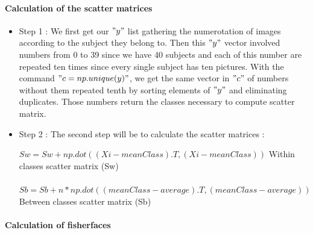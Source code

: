 \paragraph{Calculation of the scatter matrices }
\begin{itemize}
\item Step 1 : We first get our $"y"$ list  gathering the numerotation of images according to the subject they belong to. Then this $"y"$ vector involved numbers from 0 to 39 since we have 40 subjects and each of this number are repeated ten times since every single subject has ten pictures. With the command $"c = np.unique(y)"$, we get the same vector in $"c"$ of numbers without them repeated tenth by sorting elements of $"y"$ and eliminating duplicates. Those numbers return the classes necessary to compute scatter matrix.
\item Step 2 : The second step will be to calculate the scatter matrices :

\begin{center}
		$Sw = Sw + np.dot((Xi-meanClass).T, (Xi-meanClass))$
		 Within classes scatter matrix (Sw)
	

\paragraph{}
$Sb = Sb + n * np.dot((meanClass - average).T, (meanClass - average))$
Between  classes scatter matrix (Sb)

\end{center}


\end{itemize} 
\paragraph{Calculation of fisherfaces }

